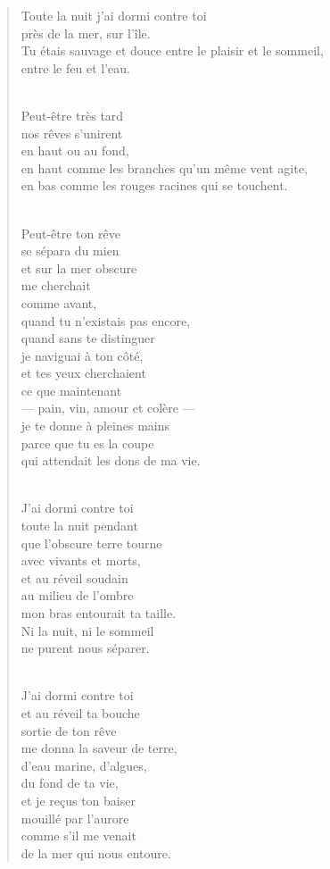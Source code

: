 \documentclass[11pt,a4paper]{book}
\begin{document}
\begin{verse}
Toute la nuit j'ai dormi contre toi \\
près de la mer, sur l'île. \\
Tu étais sauvage et douce entre le plaisir et le sommeil, \\
entre le feu et l'eau. \\ \

Peut-être très tard \\
nos rêves s'unirent \\
en haut ou au fond, \\
en haut comme les branches qu'un même vent agite, \\
en bas comme les rouges racines qui se touchent. \\ \

Peut-être ton rêve \\
se sépara du mien \\
et sur la mer obscure \\
me cherchait \\
comme avant, \\
quand tu n'existais pas encore, \\
quand sans te distinguer \\
je naviguai à ton côté, \\
et tes yeux cherchaient \\
ce que maintenant \\
--- pain, vin, amour et colère --- \\
je te donne à pleines mains \\
parce que tu es la coupe \\
qui attendait les dons de ma vie. \\ \

J'ai dormi contre toi \\
toute la nuit pendant \\
que l'obscure terre tourne \\
avec vivants et morts, \\
et au réveil soudain \\
au milieu de l'ombre \\
mon bras entourait ta taille. \\
Ni la nuit, ni le sommeil \\
ne purent nous séparer. \\ \

J'ai dormi contre toi \\
et au réveil ta bouche \\
sortie de ton rêve \\
me donna la saveur de terre, \\
d'eau marine, d'algues, \\
du fond de ta vie, \\
et je re\c{c}us ton baiser \\
mouillé par l'aurore \\
comme s'il me venait \\
de la mer qui nous entoure.
\end{verse}
\end{document}
